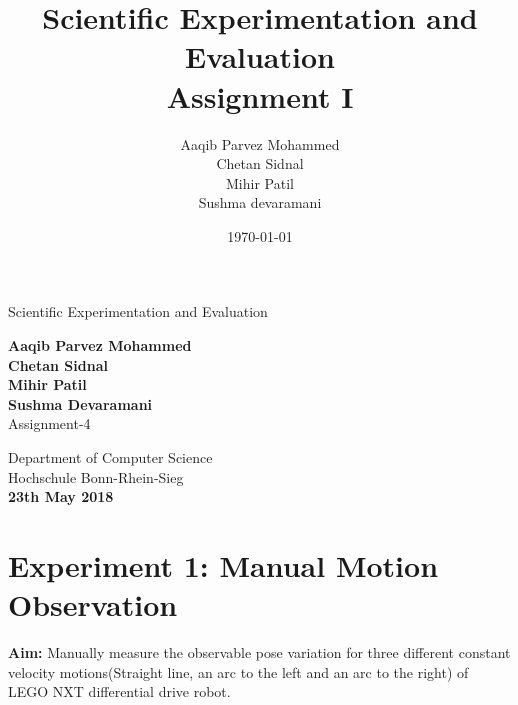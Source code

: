 \documentclass[11pt,a4paper,titlepage]{article}
\begin{document}
\begin{titlepage}

\begin{center}
\title{\textbf{Scientific Experimentation and Evaluation}\\ Assignment I}
\author{Aaqib Parvez Mohammed \\ Chetan Sidnal\\ Mihir Patil \\ Sushma devaramani}
\date{\today}


        \Large Scientific Experimentation and Evaluation \\ %
\end{center}

\vspace{0.5cm}
       \normalsize

        \begin{center}
        \textbf{Aaqib Parvez Mohammed \\Chetan Sidnal\\ Mihir Patil\\ Sushma Devaramani}\\
        \vspace{1 cm}
        Assignment-4 \\
        \textit{}


            \vspace{2 cm}

        Department of Computer Science\\
        Hochschule Bonn-Rhein-Sieg\\

        \vspace{0.5 cm}
        \textbf{ 23th May 2018}%

        \end{center}
        \vspace{0.8 cm}
\end{titlepage}
\tableofcontents
\newpage
\listoffigures
\newpage
\section{Experiment 1: Manual Motion Observation}
\textbf{Aim:} Manually measure the observable pose variation for three different constant velocity motions(Straight line, an arc to the left and an arc to the right) of LEGO NXT differential drive robot.
\end{document}
